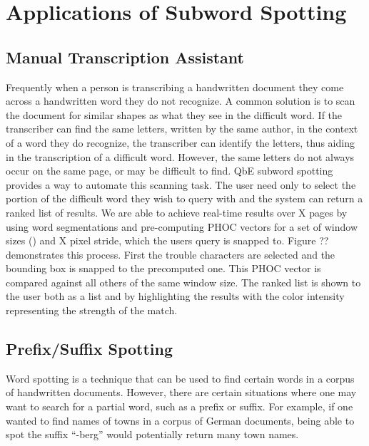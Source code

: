 \documentclass[ms,electronic,twosidetoc,letterpaper,chaptercenter,parttop,lol,lof,lot]{byumsphd}
\begin{document}

\chapter{Applications of Subword Spotting}\label{applications}

\section{Manual Transcription Assistant}
Frequently when a person is transcribing a handwritten document they come across a handwritten word they do not recognize. A common solution is to scan the document for similar shapes as what they see in the difficult word. If the transcriber can find the same letters, written by the same author, in the context of a word they do recognize, the transcriber can identify the letters, thus aiding in the transcription of a difficult word. However, the same letters do not always occur on the same page, or may be difficult to find. QbE subword spotting provides a way to automate this scanning task. The user need only to select the portion of the difficult word they wish to query with and the system can return a ranked list of results.
We are able to achieve real-time results over X pages by using word segmentations and pre-computing PHOC vectors for a set of window sizes () and X  pixel stride, which the users query is snapped to. 
Figure ?? demonstrates this process. First the trouble characters are selected and the bounding box is snapped to the precomputed one. This PHOC vector is compared against all others of the same window size. The ranked list is shown to the user both as a list and by highlighting the results with the color intensity representing the strength of the match.


\section{Prefix/Suffix Spotting}
Word spotting is a technique that can be used to find certain words in a corpus of handwritten documents. However, there are certain situations where one may want to search for a partial word, such as a prefix or suffix. For example, if one wanted to find names of towns in a corpus of German documents, being able to spot the suffix ``-berg'' would potentially return many town names.
\end{document}
